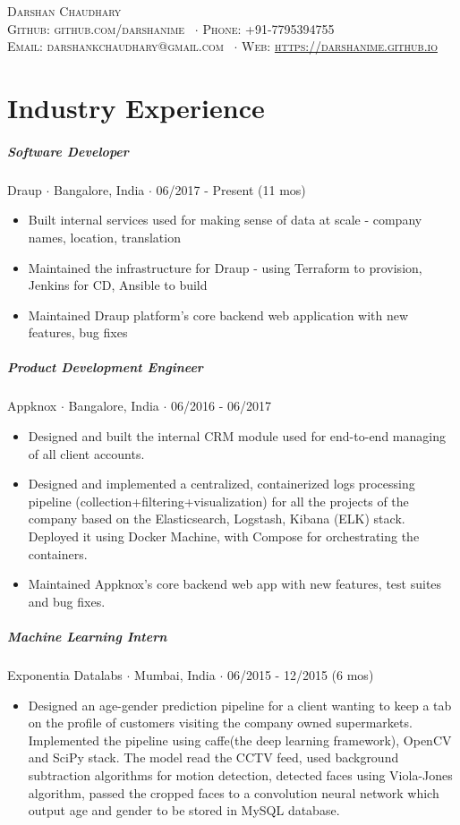 \documentclass[10pt,letterpaper]{article}
\newcommand{\namestyle}{\Huge \scshape}
\newcommand{\addressstyle}{\color{addresscolor} \footnotesize \rmfamily \upshape}
\begin{document}
\begin{center}
    \namestyle Darshan Chaudhary \\[0.3em]
    \addressstyle Github: github.com/darshanime \ $\cdot$ Phone: +91-7795394755\\
    Email: darshankchaudhary@gmail.com \ $\cdot$ Web: \url{https://darshanime.github.io}
\end{center}

\small


\section*{Industry Experience}

\subparagraph{Software Developer}
Draup $\cdot$ Bangalore, India $\cdot$ 06/2017 - Present (11 mos)
\begin{itemize}
    \item Built internal services used for making sense of data at scale - company names, location, translation
    \item Maintained the infrastructure for Draup - using Terraform to provision, Jenkins for CD, Ansible to build
    \item Maintained Draup platform's core backend web application with new features, bug fixes
\end{itemize}

\subparagraph{Product Development Engineer}
Appknox $\cdot$ Bangalore, India $\cdot$ 06/2016 - 06/2017
\begin{itemize}
    \item Designed and built the internal CRM module used for end-to-end managing of all client accounts.
    \item Designed and implemented a centralized, containerized logs processing pipeline (collection+filtering+visualization) for all the projects of the company based on the Elasticsearch, Logstash, Kibana (ELK) stack. Deployed it using Docker Machine, with Compose for orchestrating the containers.
    \item Maintained Appknox's core backend web app with new features, test suites and bug fixes.
\end{itemize}

\subparagraph{Machine Learning Intern}
Exponentia Datalabs $\cdot$ Mumbai, India $\cdot$ 06/2015 - 12/2015 (6 mos)
\begin{itemize}
    \item Designed an age-gender prediction pipeline for a client wanting to keep a tab on the profile of customers visiting the company owned supermarkets. Implemented the pipeline using caffe(the deep learning framework), OpenCV and SciPy stack. The model read the CCTV feed, used background subtraction algorithms for motion detection, detected faces using Viola-Jones algorithm, passed the cropped faces to a convolution neural network which output age and gender to be stored in MySQL database.
\end{itemize}
\end{document}
